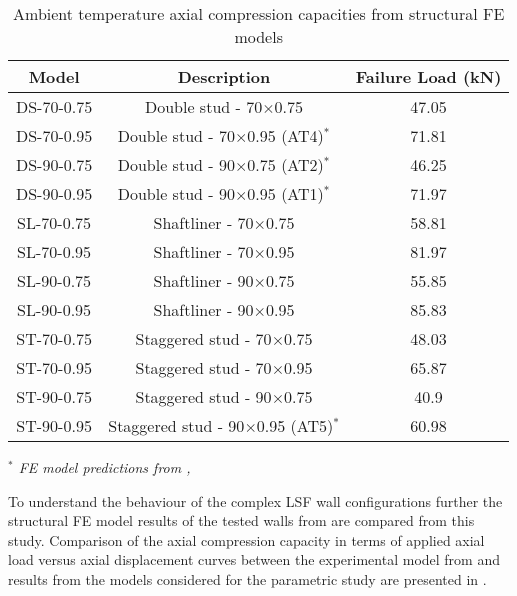 \begin{table}[!htbp]
	\centering
	\begin{threeparttable}
			\caption{Ambient temperature axial compression capacities from structural FE models}
				\begin{tabular}{ccc}
					\toprule
					Model & Description & Failure Load (kN) \\
					\midrule
					DS-70-0.75 & Double stud - 70$\times$0.75 & 47.05 \\
					DS-70-0.95 & Double stud - 70$\times$0.95 (AT4)$^*$ & 71.81 \\
					DS-90-0.75 & Double stud - 90$\times$0.75 (AT2)$^*$ & 46.25 \\
					DS-90-0.95 & Double stud - 90$\times$0.95 (AT1)$^*$ & 71.97 \\
					SL-70-0.75 & Shaftliner - 70$\times$0.75 & 58.81 \\
					SL-70-0.95 & Shaftliner - 70$\times$0.95 & 81.97 \\
					SL-90-0.75 & Shaftliner - 90$\times$0.75 & 55.85 \\
					SL-90-0.95 & Shaftliner - 90$\times$0.95 & 85.83 \\
					ST-70-0.75 & Staggered stud - 70$\times$0.75 & 48.03 \\
					ST-70-0.95 & Staggered stud - 70$\times$0.95 & 65.87 \\
					ST-90-0.75 & Staggered stud - 90$\times$0.75 & 40.9 \\
					ST-90-0.95 & Staggered stud - 90$\times$0.95 (AT5)$^*$ & 60.98 \\
					\bottomrule
				\end{tabular}%
					\label{tab:ambient-parametric}%
						\begin{tablenotes}
							\small
							\item \textit{\(^*\) FE model predictions from , }
						\end{tablenotes}
	\end{threeparttable}
\end{table}%

To understand the behaviour of the complex LSF wall configurations further the structural FE model results of the tested walls from  are compared from this study. Comparison of the axial compression capacity in terms of applied axial load versus axial displacement curves between the experimental model from  and results from the models considered for the parametric study are presented in .

